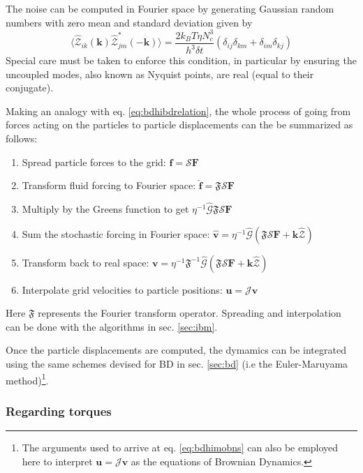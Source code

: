 \documentclass[ twoside,openright,titlepage,numbers=noenddot,%
headinclude,footinclude,cleardoublepage=empty,abstract=on,
BCOR=5mm,paper=a4,fontsize=11pt, dvipsnames
]{scrreprt}
\renewcommand{\vec}[1]{\bm{#1}}
\newcommand{\tens}[1]{\bm{\mathcal{#1}}}
\newcommand{\oper}[1]{\mathcal{#1}}
\newcommand{\dt}{\delta t}
\newcommand{\kT}{k_B T}
\newcommand{\fou}[1]{\widehat{#1}}
\newcommand{\pvel}{u}
\newcommand{\fvel}{v}
\begin{document}
The noise can be computed in Fourier space by generating Gaussian random numbers with zero mean and standard deviation given by
\begin{equation}
  \langle \fou{\mathcal{Z}}_{ik}(\vec{k})\fou{\mathcal{Z}}^*_{jm} (-\vec{k})\rangle = \frac{2\kT\eta N_c^3}{ h^3 \dt}(\delta_{ij}\delta_{km} + \delta_{im}\delta_{kj})
\end{equation}
Special care must be taken to enforce this condition, in particular by ensuring the uncoupled modes, also known as Nyquist points\cite{nyquist}, are real (equal to their conjugate).


Making an analogy with eq. \eqref{eq:bdhibdrelation}, the whole process of going from forces acting on the particles to particle displacements can the be summarized as follows:

\begin{enumerate}
\item Spread particle forces to the grid: $\vec{f} = \oper{S}\vec{F}$
\item Transform fluid forcing to Fourier space: $\fou{\vec{f}} = \mathfrak{F}\oper{S}\vec{F}$
\item Multiply by the Greens function to get $\eta^{-1}\fou{\tens{G}}\mathfrak{F}\oper{S}\vec{F}$
\item Sum the stochastic forcing in Fourier space: $\fou{\vec{\fvel}} = \eta^{-1}\fou{\tens{G}}(\mathfrak{F}\oper{S}\vec{F} + \vec{k}\fou{\mathcal{Z}})$
\item Transform back to real space: $\vec{\fvel} = \eta^{-1}\mathfrak{F}^{-1}\fou{\tens{G}}(\mathfrak{F}\oper{S}\vec{F} + \vec{k}\fou{\mathcal{Z}})$
\item Interpolate grid velocities to particle positions: $\vec{\pvel} = \oper{J}\vec{\fvel}$
\end{enumerate}
Here $\mathfrak{F}$ represents the Fourier transform operator.
Spreading and interpolation can be done with the algorithms in sec. \ref{sec:ibm}.

Once the particle displacements are computed, the dymamics can be integrated using the same schemes devised for \gls{BD} in sec. \ref{sec:bd} (i.e the Euler-Maruyama method)\footnote{The arguments used to arrive at eq. \eqref{eq:bdhimobns} can also be employed here to interpret $\vec{\pvel}=\oper{J}\vec{\fvel}$ as the equations of Brownian Dynamics.}.

\subsubsection*{Regarding torques}
\end{document}
